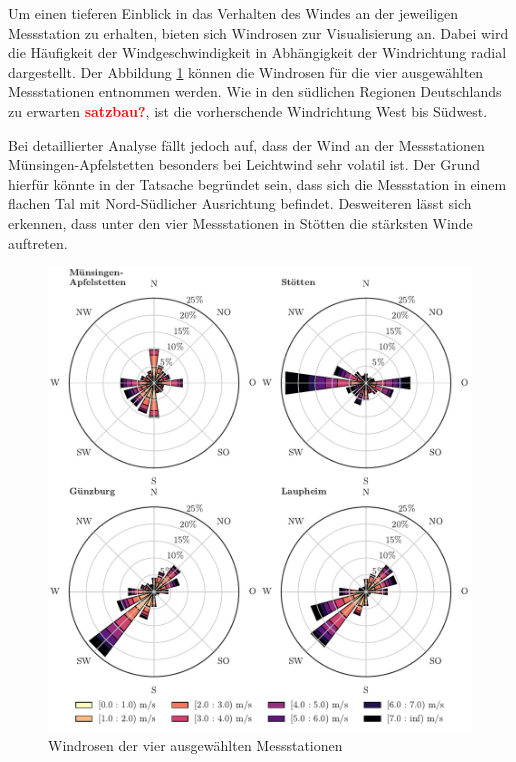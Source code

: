 \documentclass[
12pt, %
toc=listofnumbered, %
toc=chapterentrydotfill, %
numbers=noenddot, %
captions=tableheading, %
bibliography=numbered
]{scrreprt}
\newcommand{\highlight}[1]{\textbf{\textcolor{red}{#1}}}
\begin{document}
Um einen tieferen Einblick in das Verhalten des Windes an der jeweiligen Messstation zu erhalten, bieten sich Windrosen zur Visualisierung an. Dabei wird die Häufigkeit der Windgeschwindigkeit in Abhängigkeit der Windrichtung radial dargestellt. Der Abbildung \ref{fig:windroses} können die Windrosen für die vier ausgewählten Messstationen entnommen werden. Wie in den südlichen Regionen Deutschlands zu erwarten \highlight{satzbau?}, ist die vorherschende Windrichtung West bis Südwest. 

Bei detaillierter Analyse fällt jedoch auf, dass der Wind an der Messstationen Münsingen-Apfelstetten besonders bei Leichtwind sehr volatil ist. Der Grund hierfür könnte in der Tatsache begründet sein, dass sich die Messstation in einem flachen Tal mit Nord-Südlicher Ausrichtung befindet. Desweiteren lässt sich erkennen, dass unter den vier Messstationen in Stötten die stärksten Winde auftreten. 

\begin{figure}[tph]
	\begin{center}
		\includegraphics[]{./images/windroses.pdf}
		\caption{Windrosen der vier ausgewählten Messstationen}
		\label{fig:windroses}
	\end{center}
\end{figure}
\end{document}
